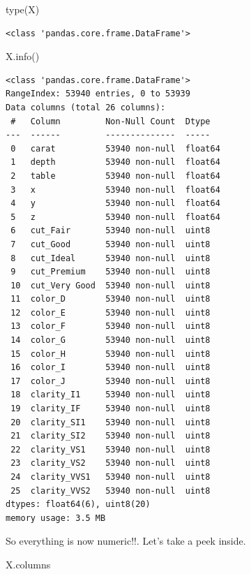 \documentclass[
  letterpaper,
]{scrbook}
\newenvironment{Shaded}{\begin{snugshade}}{\end{snugshade}}
\newcommand{\BuiltInTok}[1]{#1}
\newcommand{\NormalTok}[1]{#1}
\begin{document}
\begin{Shaded}
\begin{Highlighting}[]
\BuiltInTok{type}\NormalTok{(X)}
\end{Highlighting}
\end{Shaded}

\begin{verbatim}
<class 'pandas.core.frame.DataFrame'>
\end{verbatim}

\begin{Shaded}
\begin{Highlighting}[]
\NormalTok{X.info()}
\end{Highlighting}
\end{Shaded}

\begin{verbatim}
<class 'pandas.core.frame.DataFrame'>
RangeIndex: 53940 entries, 0 to 53939
Data columns (total 26 columns):
 #   Column         Non-Null Count  Dtype  
---  ------         --------------  -----  
 0   carat          53940 non-null  float64
 1   depth          53940 non-null  float64
 2   table          53940 non-null  float64
 3   x              53940 non-null  float64
 4   y              53940 non-null  float64
 5   z              53940 non-null  float64
 6   cut_Fair       53940 non-null  uint8  
 7   cut_Good       53940 non-null  uint8  
 8   cut_Ideal      53940 non-null  uint8  
 9   cut_Premium    53940 non-null  uint8  
 10  cut_Very Good  53940 non-null  uint8  
 11  color_D        53940 non-null  uint8  
 12  color_E        53940 non-null  uint8  
 13  color_F        53940 non-null  uint8  
 14  color_G        53940 non-null  uint8  
 15  color_H        53940 non-null  uint8  
 16  color_I        53940 non-null  uint8  
 17  color_J        53940 non-null  uint8  
 18  clarity_I1     53940 non-null  uint8  
 19  clarity_IF     53940 non-null  uint8  
 20  clarity_SI1    53940 non-null  uint8  
 21  clarity_SI2    53940 non-null  uint8  
 22  clarity_VS1    53940 non-null  uint8  
 23  clarity_VS2    53940 non-null  uint8  
 24  clarity_VVS1   53940 non-null  uint8  
 25  clarity_VVS2   53940 non-null  uint8  
dtypes: float64(6), uint8(20)
memory usage: 3.5 MB
\end{verbatim}

So everything is now numeric!!. Let's take a peek inside.

\begin{Shaded}
\begin{Highlighting}[]
\NormalTok{X.columns}
\end{Highlighting}
\end{Shaded}
\end{document}
